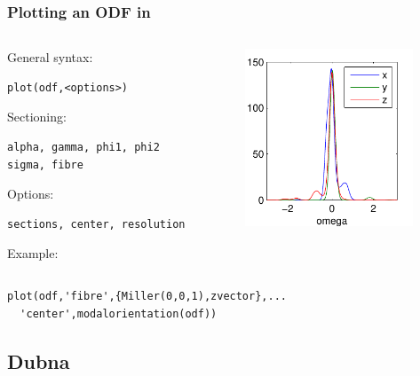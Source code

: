 \begin{frame}[fragile]
  \frametitle{Plotting  an ODF in \MTEX}

  \begin{columns}
    \begin{column}{6.5cm}
      General syntax:
\begin{lstlisting}
plot(odf,<options>)
\end{lstlisting}

      Sectioning:
\begin{lstlisting}
alpha, gamma, phi1, phi2
sigma, fibre
\end{lstlisting}

      Options:
\begin{lstlisting}
sections, center, resolution
\end{lstlisting}

      Example:
    \end{column}
    \begin{column}{5cm}
      \includegraphics[width=5cm]{pic/radialplot}
    \end{column}
  \end{columns}

\begin{lstlisting}
plot(odf,'fibre',{Miller(0,0,1),zvector},...
  'center',modalorientation(odf))
\end{lstlisting}


\end{frame}


\subsection*{Dubna}

